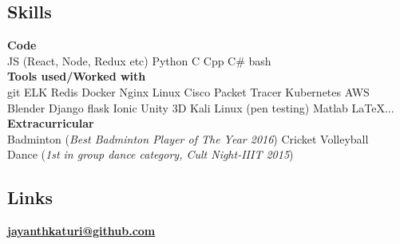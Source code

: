\documentclass[letterpaper]{deedy-resume} %
\begin{document}

\lastupdated %



\begin{minipage}[t]{0.31\textwidth} %

\vspace{\topsep} %
\vspace{\topsep} %
\subsection{Skills}
\textbf{Code} \\
JS (React, Node, Redux etc) \textbullet{} Python \textbullet{} C \textbullet{} Cpp \textbullet{} C\# \textbullet{} bash \\
\textbf{Tools used/Worked with} \\
git \textbullet{} ELK \textbullet{} Redis \textbullet{} Docker
\textbullet{} Nginx \textbullet{} Linux \textbullet{} Cisco Packet Tracer
\textbullet{} Kubernetes \textbullet{} AWS \textbullet{} Blender 
\textbullet{} Django \textbullet{} flask \textbullet{} Ionic \textbullet{} Unity 3D
\textbullet{} Kali Linux (pen testing) \textbullet{} Matlab \textbullet{} \LaTeX ... \\
\textbf{Extracurricular} \\
\textbullet{} Badminton (\textit{Best Badminton Player of The Year 2016}) \textbullet{}
Cricket \textbullet{} Volleyball \\
\textbullet{} Dance (\textit{1st in group dance category, Cult Night-IIIT 2015}) \\
\sectionspace

\subsection{Links} 
\href{https://github.com/jayanthkaturi}{\bf jayanthkaturi@github.com} \\
\sectionspace %


\end{minipage}
\end{document}
